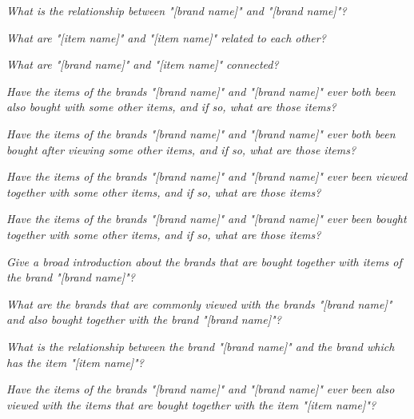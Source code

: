 
\squishlist
\item \textit{What is the relationship between "[brand name]" and "[brand name]"?}
\item \textit{What are "[item name]" and "[item name]" related to each other?}
\item \textit{What are "[brand name]" and "[item name]" connected?}
\squishend


\squishlist
\item \textit{Have the items of the brands "[brand name]" and "[brand name]" ever both been also bought with some other items, and if so, what are those items?}
\item \textit{Have the items of the brands "[brand name]" and "[brand name]" ever both been bought after viewing some other items, and if so, what are those items?}
\item \textit{Have the items of the brands "[brand name]" and "[brand name]" ever been viewed together with some other items, and if so, what are those items?}
\item \textit{Have the items of the brands "[brand name]" and "[brand name]" ever been bought together with some other items, and if so, what are those items?}
\squishend



\squishlist
\item \textit{Give a broad introduction about the brands that are bought together with items of the brand "[brand name]"?}
\item \textit{What are the brands that are commonly viewed with the brands "[brand name]" and also bought together with the brand "[brand name]"?}
\item \textit{What is the relationship between the brand "[brand name]" and the brand which has the item "[item name]"?}
\item \textit{Have the items of the brands "[brand name]" and "[brand name]" ever been also viewed with the items that are bought together with the item "[item name]"?}
\squishend
